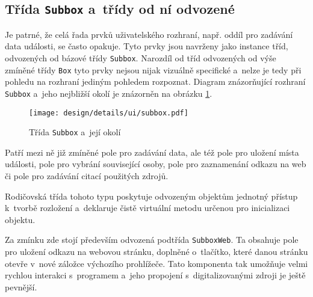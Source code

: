 		\subsection*{Třída \texttt{Subbox} a~třídy od ní odvozené}
		Je patrné, že celá řada prvků uživatelského rozhraní, např. oddíl pro zadávání data události, se často opakuje. Tyto prvky jsou navrženy jako instance tříd, odvozených od bázové třídy \texttt{Subbox}. Narozdíl od tříd odvozených od výše zmíněné třídy \texttt{Box} tyto prvky nejsou nijak vizuálně specifické a~nelze je tedy při pohledu na rozhraní jediným pohledem rozpoznat. Diagram znázorňující rozhraní \texttt{Subbox} a~jeho nejbližší okolí je znázorněn na obrázku \ref{fig:designDetailSubbox}.\par
		\begin{figure}[h]
			\centering
			\texttt{[image: design/details/ui/subbox.pdf]}
			\caption{Třída \texttt{Subbox} a~její okolí}
			\label{fig:designDetailSubbox}
		\end{figure}
		Patří mezi ně již zmíněné pole pro zadávání data, ale též pole pro uložení místa události, pole pro vybrání související osoby, pole pro zaznamenání odkazu na web či pole pro zadávání citací použitých zdrojů.\par
		Rodičovská třída tohoto typu poskytuje odvozeným objektům jednotný přístup k~tvorbě rozložení a~deklaruje čistě virtuální metodu určenou pro inicializaci objektu.\par
		Za zmínku zde stojí především odvozená podtřída \texttt{SubboxWeb}. Ta obsahuje pole pro uložení odkazu na webovou stránku, doplněné o~tlačítko, které danou stránku otevře v~nové záložce výchozího prohlížeče. Tato komponenta tak umožňuje velmi rychlou interakci s~programem a~jeho propojení s~digitalizovanými zdroji je ještě pevnější.\par
		
